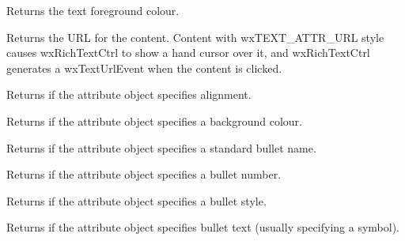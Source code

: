 \label{wxrichtextattrgettextcolour}


Returns the text foreground colour.

\label{wxrichtextattrgeturl}


Returns the URL for the content. Content with wxTEXT\_ATTR\_URL style
causes wxRichTextCtrl to show a hand cursor over it, and wxRichTextCtrl generates
a wxTextUrlEvent when the content is clicked.

\label{wxrichtextattrhasalignment}


Returns \true if the attribute object specifies alignment.

\label{wxrichtextattrhasbackgroundcolour}


Returns \true if the attribute object specifies a background colour.

\label{wxrichtextattrhasbulletname}


Returns \true if the attribute object specifies a standard bullet name.

\label{wxrichtextattrhasbulletnumber}


Returns \true if the attribute object specifies a bullet number.

\label{wxrichtextattrhasbulletstyle}


Returns \true if the attribute object specifies a bullet style.

\label{wxrichtextattrhasbullettext}


Returns \true if the attribute object specifies bullet text (usually specifying a symbol).

